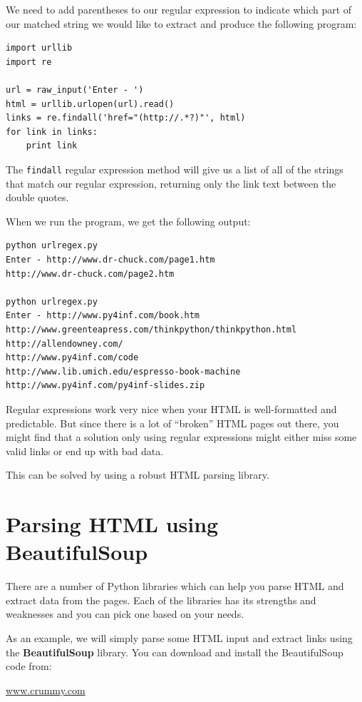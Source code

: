 \documentclass[10pt]{book}
\begin{document}
We need to add parentheses to our regular expression to indicate
which part of our matched string we would like to extract and
produce the following program:

\beforeverb
\begin{verbatim}
import urllib
import re

url = raw_input('Enter - ')
html = urllib.urlopen(url).read()
links = re.findall('href="(http://.*?)"', html)
for link in links:
    print link
\end{verbatim}
\afterverb
%
The {\tt findall} regular expression method will give us a list of all
of the strings that match our regular expression, returning only
the link text between the double quotes.

When we run the program, we get the following output:

\beforeverb
\begin{verbatim}
python urlregex.py 
Enter - http://www.dr-chuck.com/page1.htm
http://www.dr-chuck.com/page2.htm

python urlregex.py 
Enter - http://www.py4inf.com/book.htm
http://www.greenteapress.com/thinkpython/thinkpython.html
http://allendowney.com/
http://www.py4inf.com/code
http://www.lib.umich.edu/espresso-book-machine
http://www.py4inf.com/py4inf-slides.zip
\end{verbatim}
\afterverb
%
Regular expressions work very nice when your HTML is well-formatted
and predictable.  But since there is a lot of ``broken'' HTML pages
out there, you might find that a solution only using 
regular expressions might either miss some valid links or end up 
with bad data.

This can be solved by using a robust HTML parsing library.

\section{Parsing HTML using BeautifulSoup}

There are a number of Python libraries which can help you parse
HTML and extract data from the pages.  Each of the libraries
has its strengths and weaknesses and you can pick one based on 
your needs.

As an example, we will simply parse some HTML input 
and extract links using the {\bf BeautifulSoup} library.   
You can download and install the BeautifulSoup code
from:

\url{www.crummy.com}
\end{document}
